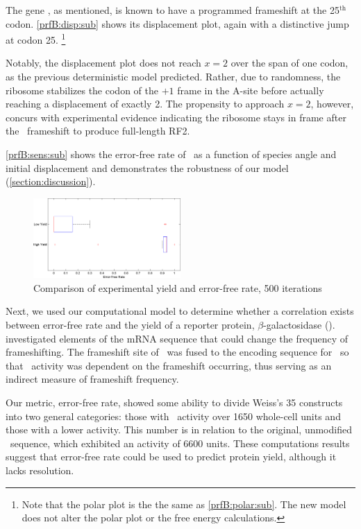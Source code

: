 \documentclass[12pt]{article}
\begin{document}
The gene \prfB, as mentioned, is known
to have a programmed frameshift at the 25$^{\textrm{th}}$ codon.
\autoref{prfB:disp:sub} shows its displacement plot,
again with a distinctive jump at codon 25.
\footnote{Note that the polar plot is the the same as \autoref{prfB:polar:sub}.
The new model does not alter the polar plot or the free energy calculations.}

Notably, the displacement plot does not reach $x=2$ over the span of
one codon, as the previous deterministic model predicted.  Rather, due to randomness, the
ribosome stabilizes the codon of the $+1$ frame in the A-site before actually reaching
a displacement of exactly 2.  The propensity to approach $x=2$,
however, concurs with experimental evidence indicating the ribosome
stays in frame after the \prfB\ frameshift to produce full-length RF2.
  
\autoref{prfB:sens:sub} shows the error-free rate of \prfB\ as a function
of species angle and initial displacement and demonstrates the
robustness of our model (\autoref{section:discussion}).

\begin{figure}
  \caption{Comparison of experimental yield and error-free rate, 500 iterations}
  \label{weissboxplot}
  \includegraphics[width=0.5\textwidth]{histograms/weissbox}
\end{figure}

Next, we used our computational model to determine whether a correlation exists between 
error-free rate and the yield of a reporter protein, $\beta$-galactosidase (\bgals).  
\citet{weiss87} investigated elements of the mRNA sequence that could change the frequency 
of frameshifting.  The frameshift site of \prfB\ was fused to the encoding sequence for 
\bgals\ so that \bgals\ activity was dependent on the frameshift occurring, 
thus serving as an indirect measure of frameshift frequency.  

Our metric, error-free rate, showed some ability to divide Weiss's 35 constructs into 
two general categories: those with \bgals\ activity over 1650 whole-cell units and those with a 
lower activity.  This number is in relation to the original, unmodified \prfB\ sequence, 
which exhibited an activity of 6600 units.  These computations results suggest that 
error-free rate could be used to predict protein yield, although it lacks resolution.
\end{document}
